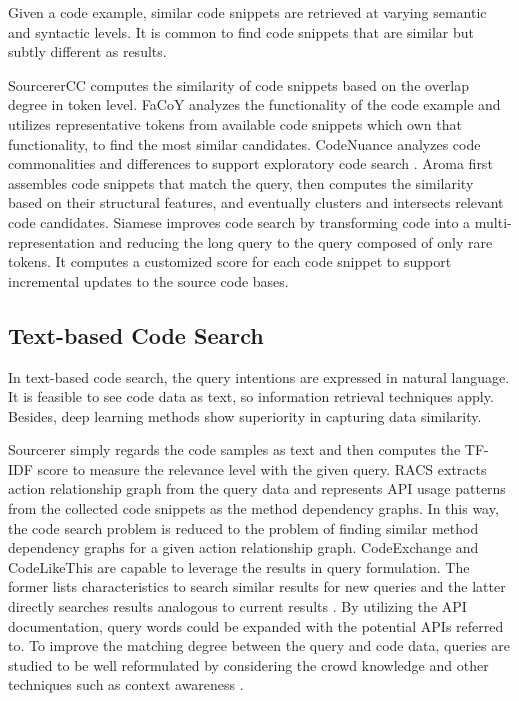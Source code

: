 \documentclass[conference]{IEEEtran}
\begin{document}
Given a code example, similar code snippets are retrieved at varying semantic and syntactic levels. It is common to find code snippets that are similar but subtly different as results.

SourcererCC \cite{Sajnani2016SourcererCCSC} computes the similarity of code snippets based on the overlap degree in token level. FaCoY \cite{Kim2018FaCoYA} analyzes the functionality of the code example and utilizes representative tokens from available code snippets which own that functionality, to find the most similar candidates. CodeNuance analyzes code commonalities and differences to support exploratory code search \cite{Liu2018SupportingEC}. Aroma \cite{Luan2018AromaCR} first assembles code snippets that match the query, then computes the similarity based on their structural features, and eventually clusters and intersects relevant code candidates. Siamese \cite{Ragkhitwetsagul2019SiameseSA} improves code search by transforming code into a multi-representation and reducing the long query to the query composed of only rare tokens. It computes a customized score for each code snippet to support incremental updates to the source code bases.

\subsection{Text-based Code Search}

In text-based code search, the query intentions are expressed in natural language. It is feasible to see code data as text, so information retrieval techniques apply. Besides, deep learning methods show superiority in capturing data similarity.

Sourcerer \cite{Linstead2008SourcererMA} simply regards the code samples as text and then computes the TF-IDF \cite{Haiduc2013AutomaticQR} score to measure the relevance level with the given query. RACS \cite{Li2016RelationshipawareCS} extracts action relationship graph from the query data and represents API usage patterns from the collected code snippets as the method dependency graphs. In this way, the code search problem is reduced to the problem of finding similar method dependency graphs for a given action relationship graph. CodeExchange and CodeLikeThis are capable to leverage the results in query formulation. The former lists characteristics to search similar results for new queries and the latter directly searches results analogous to current results \cite{Martie2017UnderstandingTI}. By utilizing the API documentation, query words could be expanded \cite{Lv2015CodeHowEC,Zhang2018ExpandingQF} with the potential APIs referred to. To improve the matching degree between the query and code data, queries are studied to be well reformulated by considering the crowd knowledge and other techniques such as context awareness \cite{Sirres2017AugmentingAS,Rahman2018EffectiveRO,Rahman2019AutomaticQR,Huang2019EnhanceCS}.
\end{document}
